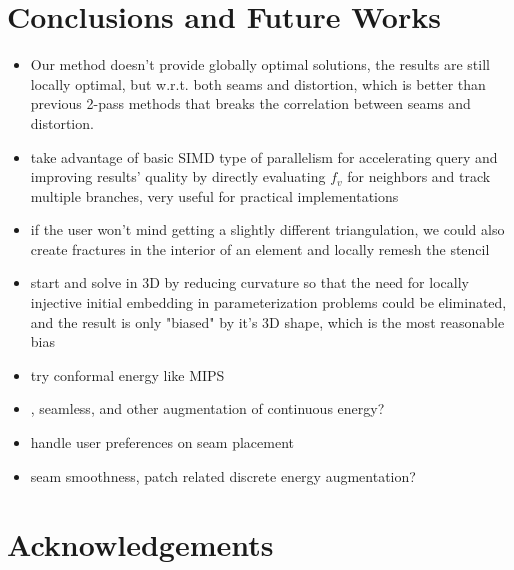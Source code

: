 \section{Conclusions and Future Works}

\begin{itemize}
\item Our method doesn't provide globally optimal solutions, the results are still locally optimal, but w.r.t. both seams and distortion, which is better than previous 2-pass methods that breaks the correlation between seams and distortion.
\item take advantage of basic SIMD type of parallelism for accelerating query and improving results' quality by directly evaluating $f_v$ for neighbors and track multiple branches, very useful for practical implementations
\item if the user won't mind getting a slightly different triangulation, we could also create fractures in the interior of an element and locally remesh the stencil
\item start and solve in 3D by reducing curvature so that the need for locally injective initial embedding in parameterization problems could be eliminated, and the result is only "biased" by it's 3D shape, which is the most reasonable bias
\item try conformal energy like MIPS
\item {}, seamless, and other augmentation of continuous energy?
\item handle user preferences on seam placement
\item seam smoothness, patch related discrete energy augmentation?
\end{itemize}

\section{Acknowledgements}